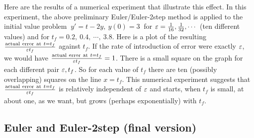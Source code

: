 Here are the results of a numerical experiment that illustrate this effect. 
In this experiment, the above preliminary Euler/Euler-2step method is applied to the initial value problem
$\ 
y'=t-2y,\ 
y(0)=3
\ $
for $\varepsilon=\frac{1}{16},\frac{1}{32},\cdots$ (ten different values)
and for $t_f=0.2,\ 0.4,\ \cdots,\ 3.8$.
Here  is a plot of the resulting
$\frac{{\rm actual\ error\ at\ }t=t_f}{\varepsilon t_f}$ against $t_f$.
If the rate of introduction of error were exactly $\varepsilon$, we would have
$\frac{{\rm actual\ error\ at\ }t=t_f}{\varepsilon t_f}=1$.
There is a small square on the graph for each different pair $\varepsilon,t_f$. So for
each value of $t_f$ there are ten (possibly overlapping) squares on the line $x=t_f$. This numerical
experiment suggests that $\frac{{\rm actual\ error\ at\ }t=t_f}{\varepsilon t_f}$
is relatively independent of $\varepsilon$ and starts, when $t_f$ is small, 
at about one, as we want, but grows (perhaps exponentially) with $t_f$.

\subsection{Euler and Euler-2step (final version)}\label{ssec final E E2}

